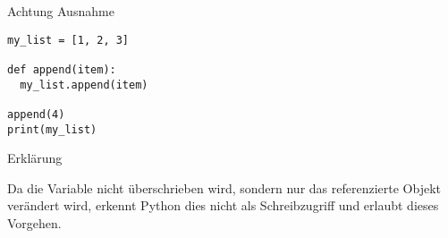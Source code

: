 \begin{fragile}
\begin{alertblock}{Achtung Ausnahme}
\begin{verbatim}
my_list = [1, 2, 3]

def append(item):
  my_list.append(item)

append(4)
print(my_list)
\end{verbatim}
\end{alertblock}

\vspace{12pt}

\begin{exampleblock}{Erklärung}
	
\pause 

Da die Variable  nicht überschrieben wird, sondern nur das referenzierte Objekt verändert wird, erkennt Python dies nicht als Schreibzugriff und erlaubt dieses Vorgehen. 
\end{exampleblock}
\end{fragile}


